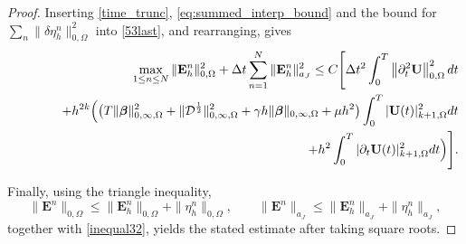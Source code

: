 \documentclass[10pt,a4paper]{amsart}
\newcommand\bE{\mathbf{E}}
\newcommand\bbeta{{\boldsymbol{\beta}}}
\begin{document}
\begin{proof}
Inserting \eqref{time_trunc}, \eqref{eq:summed_interp_bound} and the bound for $\sum_n\|\delta\eta_h^n\|_{0,\Omega}^2$ into \eqref{53last}, and rearranging, gives
\begin{equation}
	\begin{aligned}
		\max_{1\leq n\leq N}\|\bE_h^n \|_{0,\Omega}^2+\Delta t\sum_{n=1}^{N}\|\bE_h^n \|_{a_{J}}^2
		\leq C\Bigg[
		\Delta t^{2}\int_{0}^{T} \left\|\partial_{t}^{2}\mathbf{U}\right\|_{0,\Omega}^2 {\rm d}t\\
		\qquad\qquad
		+h^{2k}\Big(\big(T\|\bbeta\|_{0,\infty,\Omega}^{2}+\|\mathcal{D}^{\frac{1}{2}}\|_{0,\infty,\Omega}^{2}+\gamma h\|\bbeta\|_{0,\infty,\Omega}+\mu h^{2}\big)\int_{0}^{T}|\mathbf{U}(t)|_{k+1,\Omega}^{2}{\rm d}t\\
		\qquad\qquad\qquad\qquad
		+h^{2}\int_{0}^{T}|\partial_{t}\mathbf{U}(t)|_{k+1,\Omega}^{2}{\rm d}t\Big)\Bigg].
	\end{aligned}
\end{equation}

Finally, using the triangle inequality,
\[
	\|\bE^n\|_{0,\Omega} \le \|\bE_h^n\|_{0,\Omega}+\|\eta_h^n\|_{0,\Omega},
	\qquad
	\|\bE^n\|_{a_J} \le \|\bE_h^n\|_{a_J}+\|\eta_h^n\|_{a_J},
\]
together with \eqref{inequal32}, yields the stated estimate after taking square roots.
\end{proof}
\end{document}
